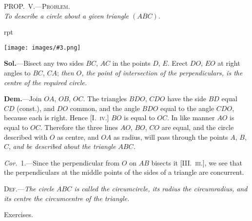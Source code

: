 \documentclass[oneside]{book}
\newcounter{wrapwidth}
\newcommand\myprop[2]{
\bigskip\Needspace*{4\baselineskip}\begin{center}\textsc{#1}\\\medskip\emph{#2}\par\end{center}
}
\newcommand\exhead[1]{
\Needspace*{5\baselineskip}\begin{center}
\textsf{#1}
\end{center}
}
\newcommand\imgflow[3]{
\setcounter{wrapwidth}{#1}
\begin{wrapfigure}[#2]{r}{\value{wrapwidth}pt}
\begin{center}
\vspace{-0.3in}
\texttt{[image: images/\#3.png]}
\end{center}
\end{wrapfigure}
}
\begin{document}
\myprop{PROP\@.~V.---Problem.}{To describe a circle about a given triangle $(ABC)$.}

\imgflow{108}{10}{f156}

\textbf{Sol.}---Bisect any two sides $BC$, $AC$ in the points $D$, $E$.
Erect $DO$, $EO$ at right angles to $BC$,
$CA$; \emph{then $O$, the point of intersection
of the perpendiculars, is the centre
of the required circle.}

\textbf{Dem.}---Join $OA$, $OB$, $OC$. The
triangles $BDO$, $CDO$ have the side
$BD$ equal $CD$ (const.), and $DO$ common,
and the angle $BDO$ equal to
the angle $CDO$, because each is
right. Hence [I.~\textsc{iv.}] $BO$ is equal to $OC$. In like
manner $AO$ is equal to $OC$. Therefore the three lines
$AO$, $BO$, $CO$ are equal, and the circle described with
$O$ as centre, and $OA$ as radius, will pass through the
points $A$, $B$, $C$, \emph{and be described about the triangle $ABC$.}

\emph{Cor.}~1.---Since the perpendicular from $O$ on $AB$ bisects
it [III\@.~\textsc{iii.}], we see that the perpendiculars at the
middle points of the sides of a triangle are concurrent.

\textsc{Def.}---\textit{The circle $ABC$ is called the circumcircle, its
radius the circumradius, and its centre the circumcentre
of the triangle.}

\exhead{Exercises.}
\end{document}
